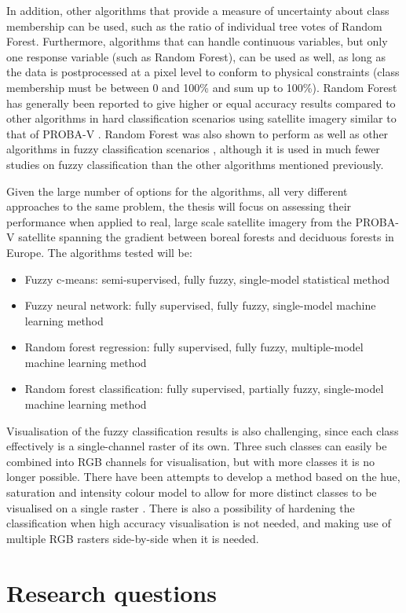 \documentclass[a4paper,10pt]{article}
\begin{document}
In addition, other algorithms that provide a measure of uncertainty about class membership can be used, such as the ratio of individual tree votes of Random Forest. Furthermore, algorithms that can handle continuous variables, but only one response variable (such as Random Forest), can be used as well, as long as the data is postprocessed at a pixel level to conform to physical constraints (class membership must be between 0 and 100\% and sum up to 100\%). Random Forest has generally been reported to give higher or equal accuracy results compared to other algorithms in hard classification scenarios using satellite imagery similar to that of PROBA-V \cite{duro2012algorithmcomparison}. Random Forest was also shown to perform as well as other algorithms in fuzzy classification scenarios \cite{walton2008subpixelrf}, although it is used in much fewer studies on fuzzy classification than the other algorithms mentioned previously.

Given the large number of options for the algorithms, all very different approaches to the same problem, the thesis will focus on assessing their performance when applied to real, large scale satellite imagery from the PROBA-V satellite spanning the gradient between boreal forests and deciduous forests in Europe. The algorithms tested will be:

\begin{itemize}
 \item Fuzzy c-means: semi-supervised, fully fuzzy, single-model statistical method
 \item Fuzzy neural network: fully supervised, fully fuzzy, single-model machine learning method
 \item Random forest regression: fully supervised, fully fuzzy, multiple-model machine learning method
 \item Random forest classification: fully supervised, partially fuzzy, single-model machine learning method
\end{itemize}

Visualisation of the fuzzy classification results is also challenging, since each class effectively is a single-channel raster of its own. Three such classes can easily be combined into RGB channels for visualisation, but with more classes it is no longer possible. There have been attempts to develop a method based on the hue, saturation and intensity colour model to allow for more distinct classes to be visualised on a single raster \cite{hengl2004fuzzycmeans}. There is also a possibility of hardening the classification when high accuracy visualisation is not needed, and making use of multiple RGB rasters side-by-side when it is needed.

\section{Research questions}


\end{document}
